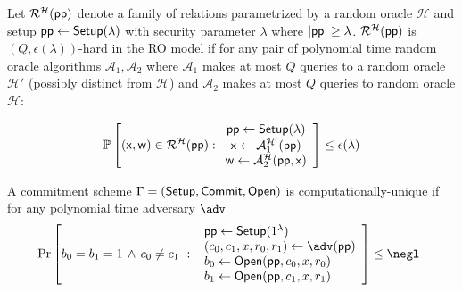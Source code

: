 \begin{definition} Let $\mathcal{R}^\mathcal{H}(\textsf{pp})$ denote a family of relations parametrized by a random oracle $\mathcal{H}$ and setup $\textsf{pp} \gets \textsf{{Setup}}(\lambda)$ with security parameter $\lambda$ where $|\textsf{pp}| \geq \lambda$. $\mathcal{R}^\mathcal{H}(\textsf{pp})$ is $(Q, \epsilon(\lambda))$-hard in the RO model if for any pair of polynomial time random oracle algorithms $\mathcal{A}_1, \mathcal{A}_2$ where $\mathcal{A}_1$ makes at most $Q$ queries to a random oracle $\mathcal{H}'$ (possibly distinct from $\mathcal{H}$) and $\mathcal{A}_2$ makes at most $Q$ queries to random oracle $\mathcal{H}$: 

$$\mathbb{P}\left[(\mathsf{x}, \mathsf{w}) \in \mathcal{R}^\mathcal{H}(\textsf{pp}): \begin{array}{c} \textsf{pp} \gets \textsf{{Setup}}(\lambda) \\ \mathsf{x} \gets \mathcal{A}_1^{\mathcal{H}'}(\textsf{pp}) \\ \mathsf{w} \gets \mathcal{A}_2^{\mathcal{H}}(\textsf{pp}, \mathsf{x}) \end{array} \right] \leq \epsilon(\lambda)$$

	
\end{definition}
\begin{definition}\label{def:uniqueness} 
	A commitment scheme $\Gamma=(\textsf{{Setup}},\textsf{{Commit}}, \textsf{{Open}})$ is computationally-unique if for any polynomial time adversary $\adv$
\[
    \Pr\left[
        b_0 = b_1 =1 \, \wedge \, c_0 \neq c_1 \ : \
        \begin{array}{l}
             \params \gets \pro{Setup}(1^\lambda) \\
             (c_0,c_1, x, r_0, r_1) \gets \adv(\params) \\
             b_0 \gets \pro{Open}(\params, c_0, x, r_0) \\
             b_1 \gets \pro{Open}(\params, c_1, x, r_1) \\
        \end{array}
    \right] \leq \negl \enspace 
\]	 
\end{definition}


